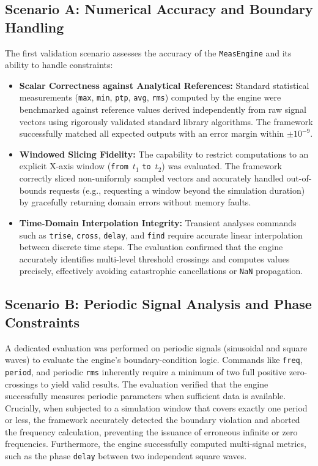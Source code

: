 \subsection{Scenario A: Numerical Accuracy and Boundary Handling}
\label{sec:meas-verify}

The first validation scenario assesses the accuracy of the \texttt{MeasEngine} and its ability to handle constraints:

\begin{itemize}
    \item \textbf{Scalar Correctness against Analytical References:} Standard statistical measurements (\texttt{max}, \texttt{min}, \texttt{ptp}, \texttt{avg}, \texttt{rms}) computed by the engine were benchmarked against reference values derived independently from raw signal vectors using rigorously validated standard library algorithms. The framework successfully matched all expected outputs with an error margin within $\pm 10^{-9}$.
    \item \textbf{Windowed Slicing Fidelity:} The capability to restrict computations to an explicit X-axis window (\texttt{from}~$t_1$ \texttt{to}~$t_2$) was evaluated. The framework correctly sliced non-uniformly sampled vectors and accurately handled out-of-bounds requests (e.g., requesting a window beyond the simulation duration) by gracefully returning domain errors without memory faults.
    \item \textbf{Time-Domain Interpolation Integrity:} Transient analyses commands such as \texttt{trise}, \texttt{cross}, \texttt{delay}, and \texttt{find} require accurate linear interpolation between discrete time steps. The evaluation confirmed that the engine accurately identifies multi-level threshold crossings and computes values precisely, effectively avoiding catastrophic cancellations or \texttt{NaN} propagation.
\end{itemize}

\subsection{Scenario B: Periodic Signal Analysis and Phase Constraints}

A dedicated evaluation was performed on periodic signals (sinusoidal and square waves) to evaluate the engine's boundary-condition logic. Commands like \texttt{freq}, \texttt{period}, and periodic \texttt{rms} inherently require a minimum of two full positive zero-crossings to yield valid results. The evaluation verified that the engine successfully measures periodic parameters when sufficient data is available. Crucially, when subjected to a simulation window that covers exactly one period or less, the framework accurately detected the boundary violation and aborted the frequency calculation, preventing the issuance of erroneous infinite or zero frequencies. Furthermore, the engine successfully computed multi-signal metrics, such as the phase \texttt{delay} between two independent square waves.

